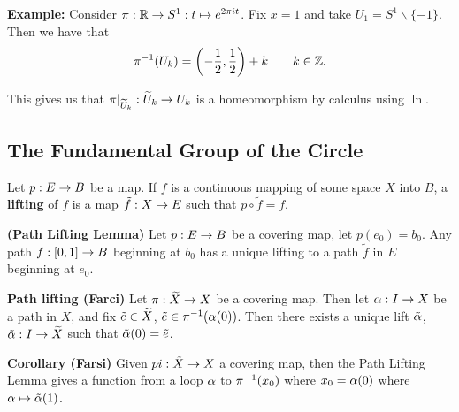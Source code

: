 \vs

\textbf{Example:} Consider $\pi:\mathbb{R} \rightarrow S^1:t \mapsto e^{2\pi i t}$. Fix $x = 1$ and take $U_1 = S^1 \backslash \{-1\}$. Then we have that
\[\pi^{-1}(U_k) = \left( -\frac{1}{2}, \frac{1}{2}\right) + k\qquad k \in \mathbb{Z}.\]

This gives us that $\pi|_{\widetilde U_k}:\widetilde U_k\rightarrow U_k$ is a homeomorphism by calculus using $\ln$.







\subsection{The Fundamental Group of the Circle}\nl
\setcounter{section}{54}
\setcounter{thm}{0}


\dfn Let $p:E \rightarrow B$ be a map. If $f$ is a continuous mapping of some space $X$ into $B$, a \textbf{lifting} of $f$ is a map $\tilde f:X\rightarrow E$ such that $p\circ \tilde f = f$.
\begin{center}
\end{center}

\vs

\begin{lem}\textbf{(Path Lifting Lemma)}
Let $p:E\rightarrow B$ be a covering map, let $p(e_0) = b_0$. Any path $f:[0,1] \rightarrow B$ beginning at $b_0$ has a unique lifting to a path $\tilde f$ in $E$ beginning at $e_0$.
\end{lem}

\vs

\textbf{Path lifting (Farci)} Let $\pi: \widetilde X \rightarrow X$ be a covering map. Then let $\alpha: I \rightarrow X$ be a path in $X$, and fix $\tilde e\in \widetilde X$, $\tilde e \in \pi^{-1}(\alpha(0))$. Then there exists a unique lift $\tilde{\alpha}$, $\tilde {\alpha}:I \rightarrow \widetilde X$ such that $\tilde {\alpha} (0) = \tilde e$.

\vs

\textbf{Corollary (Farsi)} Given $pi:\tilde X \rightarrow X$ a covering map, then the Path Lifting Lemma gives a function from a loop $\alpha$ to $\pi^{-1}(x_0)$ where $x_0 = \alpha(0)$ where $\alpha \mapsto \tilde {\alpha}(1)$.

